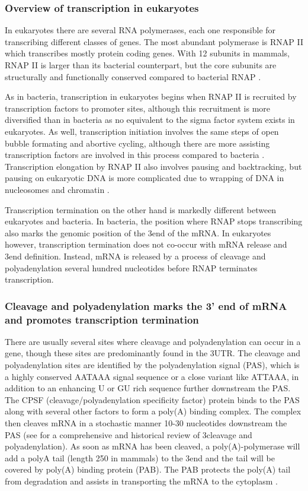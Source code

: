 %
\subsubsection{Overview of transcription in eukaryotes}
In eukaryotes there are several RNA polymerases, each one responsible for
transcribing different classes of genes. The most abundant polymerase is 
RNAP II which transcribes mostly protein coding genes. With 12 subunits in
mammals, RNAP II is larger than its bacterial counterpart, but the core
subunits are structurally and functionally conserved compared to bacterial RNAP
\cite{ebright_rna_2000}.

As in bacteria, transcription in eukaryotes begins when RNAP II is recruited by
transcription factors to promoter sites, although this recruitment is more
diversified than in bacteria as no equivalent to the sigma factor system
exists in eukaryotes. As well, transcription initiation involves the same steps
of open bubble formating and abortive cycling, although there are more
assisting transcription factors are involved in this process compared to
bacteria \cite{wade_transition_2008}. Transcription elongation by RNAP II also
involves pausing and backtracking, but pausing on eukaryotic DNA is more
complicated due to wrapping of DNA in nucleosomes and chromatin
\cite{sims_elongation_2004}.

Transcription termination on the other hand is markedly different between
eukaryotes and bacteria. In bacteria, the position where RNAP stops
transcribing also marks the genomic position of the 3\p end of the mRNA. In
eukaryotes however, transcription termination does not co-occur with mRNA
release and 3\p end definition. Instead, mRNA is released by a process of
cleavage and polyadenylation several hundred nucleotides before RNAP terminates
transcription.

\subsubsection{Cleavage and polyadenylation marks the 3' end of mRNA
and promotes transcription termination}
There are usually several sites where cleavage and polyadenylation can occur in
a gene, though these sites are predominantly found in the 3\p UTR. The cleavage
and polyadenylation sites are identified by the polyadenylation signal (PAS),
which is a highly conserved AATAAA signal sequence or a close variant like
ATTAAA, in addition to an enhancing U or GU rich sequence further downstream
the PAS. The CPSF (cleavage/polyadenylation specificity factor) protein binds
to the PAS along with several other factors to form a poly(A) binding complex.
The complex then cleaves mRNA in a stochastic manner 10-30 nucleotides
downstream the PAS (see \cite{proudfoot_ending_2011} for a comprehensive and
historical review of 3\p cleavage and polyadenylation). As soon as mRNA has
been cleaved, a poly(A)-polymerase will add a polyA tail (length 250 in
mammals) to the 3\p end and the tail will be covered by poly(A) binding protein
(PAB). The PAB protects the poly(A) tail from degradation and assists in
transporting the mRNA to the cytoplasm \cite{mangus_poly-binding_2003}.

